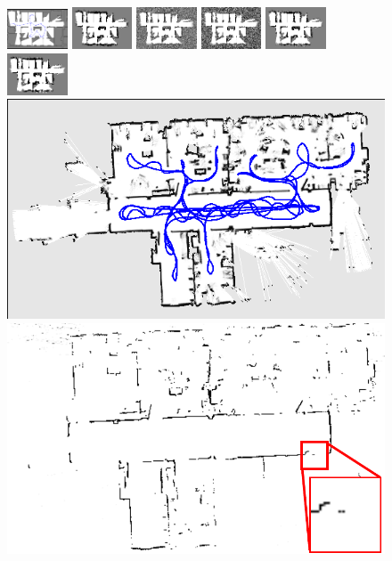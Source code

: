 \documentclass[letterpaper, 10 pt, conference]{ieeeconf} %
\begin{document}
\begin{figure}
  \includegraphics[width=0.16\textwidth]{../../Data/hospital_section_player/trajectory-gt.png}%
  \includegraphics[width=0.16\textwidth, trim=0 0 0 3px, clip]{../../Data/hospital_section_player/TwoAssumptionAlgo.png}%
  \includegraphics[width=0.16\textwidth, trim=0 0 0 3px, clip]{../../Data/hospital_section_player/SICKSlowMetropolis.png}%
  \includegraphics[width=0.16\textwidth, trim=0 0 0 3px, clip]{../../Data/hospital_section_player/SICKDDMCMC.png}%
  \includegraphics[width=0.16\textwidth, trim=0 0 0 3px, clip]{../../Data/hospital_section_player/run_belief_propagation.png}%
  \includegraphics[width=0.16\textwidth, trim=0 0 0 3px, clip]{../../Data/hospital_section_player/dualdecomposition.png}\\
  \includegraphics[height=0.16\textwidth, angle=90]{../../Data/albertb.sm/path.png}%
  \includegraphics[height=0.16\textwidth, angle=90]{../figures/zoomAndShow/zoomAndShowTwoAssumptionAlg.pdf}%

\end{figure}
\end{document}
